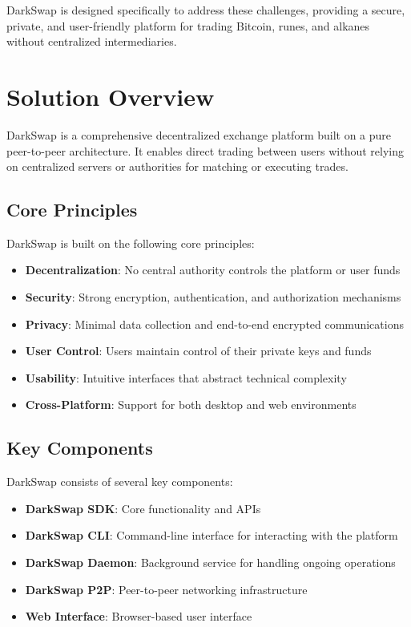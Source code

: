 \documentclass[11pt,a4paper]{article}
\begin{document}
DarkSwap is designed specifically to address these challenges, providing a secure, private, and user-friendly platform for trading Bitcoin, runes, and alkanes without centralized intermediaries.

\section{Solution Overview}

DarkSwap is a comprehensive decentralized exchange platform built on a pure peer-to-peer architecture. It enables direct trading between users without relying on centralized servers or authorities for matching or executing trades.

\subsection{Core Principles}

DarkSwap is built on the following core principles:

\begin{itemize}
    \item \textbf{Decentralization}: No central authority controls the platform or user funds
    \item \textbf{Security}: Strong encryption, authentication, and authorization mechanisms
    \item \textbf{Privacy}: Minimal data collection and end-to-end encrypted communications
    \item \textbf{User Control}: Users maintain control of their private keys and funds
    \item \textbf{Usability}: Intuitive interfaces that abstract technical complexity
    \item \textbf{Cross-Platform}: Support for both desktop and web environments
\end{itemize}

\subsection{Key Components}

DarkSwap consists of several key components:

\begin{itemize}
    \item \textbf{DarkSwap SDK}: Core functionality and APIs
    \item \textbf{DarkSwap CLI}: Command-line interface for interacting with the platform
    \item \textbf{DarkSwap Daemon}: Background service for handling ongoing operations
    \item \textbf{DarkSwap P2P}: Peer-to-peer networking infrastructure
    \item \textbf{Web Interface}: Browser-based user interface
\end{itemize}
\end{document}
